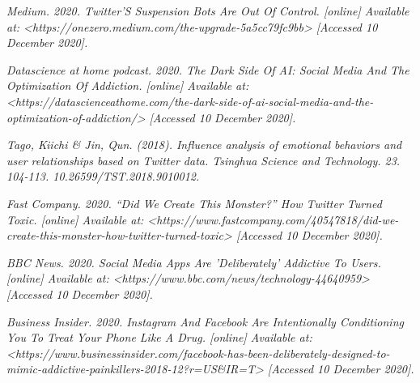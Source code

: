 \documentclass[openany]{article}
\begin{document}
\begin{thebibliography}{1}
			\textit{Medium. 2020. Twitter’S Suspension Bots Are Out Of Control. [online] Available at: <https://onezero.medium.com/the-upgrade-5a5cc79fc9bb> [Accessed 10 December 2020].}
			
			
			\textit{Datascience at home podcast. 2020. The Dark Side Of AI: Social Media And The Optimization Of Addiction. [online] Available at: <https://datascienceathome.com/the-dark-side-of-ai-social-media-and-the-optimization-of-addiction/> [Accessed 10 December 2020].}
			
			
			\textit{Tago, Kiichi \& Jin, Qun. (2018). Influence analysis of emotional behaviors and user relationships based on Twitter data. Tsinghua Science and Technology. 23. 104-113. 10.26599/TST.2018.9010012. }
			
			\textit{Fast Company. 2020. “Did We Create This Monster?” How Twitter Turned Toxic. [online] Available at: <https://www.fastcompany.com/40547818/did-we-create-this-monster-how-twitter-turned-toxic> [Accessed 10 December 2020].}		
			
			
			\textit{BBC News. 2020. Social Media Apps Are 'Deliberately' Addictive To Users. [online] Available at: <https://www.bbc.com/news/technology-44640959> [Accessed 10 December 2020].}		
			
			
			\textit{Business Insider. 2020. Instagram And Facebook Are Intentionally Conditioning You To Treat Your Phone Like A Drug. [online] Available at: <https://www.businessinsider.com/facebook-has-been-deliberately-designed-to-mimic-addictive-painkillers-2018-12?r=US\&IR=T> [Accessed 10 December 2020].}		
			
			
			

\end{thebibliography}
\end{document}
